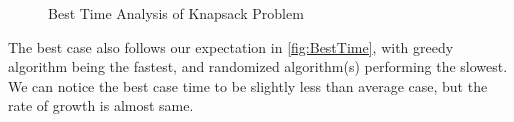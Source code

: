 \documentclass[a4paper, 11pt]{article}
\begin{document}
\begin{figure}[!ht] 
  \caption{Best Time Analysis of Knapsack Problem} 
  \centering
  \label{fig:BestTimeAnalysis}
\end{figure}

The best case also follows our expectation in \autoref{fig:BestTime}, with greedy algorithm being the fastest, and randomized algorithm(s) performing the slowest. We can notice the best case time to be slightly less than average case, but the rate of growth is almost same.
\end{document}
